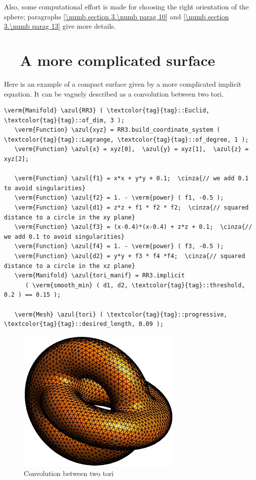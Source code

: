 Also, some computational effort is made for choosing the right orientation of the sphere;
paragraphs \ref{\numb section 3.\numb parag 10} and \ref{\numb section 3.\numb parag 13}
give more details.


\section{~~A more complicated surface}\label{\numb section 3.\numb parag 7}

Here is an example of a compact surface given by a more complicated implicit equation.
It can be vaguely described as a convolution between two tori.

\begin{Verbatim}[commandchars=\\\{\},formatcom=\small\tt,frame=single,
   label=parag-\ref{\numb section 3.\numb parag 7}.cpp,rulecolor=\color{coment},
   baselinestretch=0.94,framesep=2mm                                            ]
   \verm{Manifold} \azul{RR3} ( \textcolor{tag}{tag}::Euclid, \textcolor{tag}{tag}::of_dim, 3 );
   \verm{Function} \azul{xyz} = RR3.build_coordinate_system ( \textcolor{tag}{tag}::Lagrange, \textcolor{tag}{tag}::of_degree, 1 );
   \verm{Function} \azul{x} = xyz[0],  \azul{y} = xyz[1],  \azul{z} = xyz[2];

   \verm{Function} \azul{f1} = x*x + y*y + 0.1;  \cinza{// we add 0.1 to avoid singularities}
   \verm{Function} \azul{f2} = 1. - \verm{power} ( f1, -0.5 );
   \verm{Function} \azul{d1} = z*z + f1 * f2 * f2;  \cinza{// squared distance to a circle in the xy plane}
   \verm{Function} \azul{f3} = (x-0.4)*(x-0.4) + z*z + 0.1;  \cinza{// we add 0.1 to avoid singularities}
   \verm{Function} \azul{f4} = 1. - \verm{power} ( f3, -0.5 );
   \verm{Function} \azul{d2} = y*y + f3 * f4 *f4;  \cinza{// squared distance to a circle in the xz plane}
   \verm{Manifold} \azul{tori_manif} = RR3.implicit
      ( \verm{smooth_min} ( d1, d2, \textcolor{tag}{tag}::threshold, 0.2 ) == 0.15 );

   \verm{Mesh} \azul{tori} ( \textcolor{tag}{tag}::progressive, \textcolor{tag}{tag}::desired_length, 0.09 );
\end{Verbatim}

\begin{figure}[ht] \centering
 \includegraphics[width=80mm]{two-tori}
  \caption{Convolution between two tori}
\end{figure}

